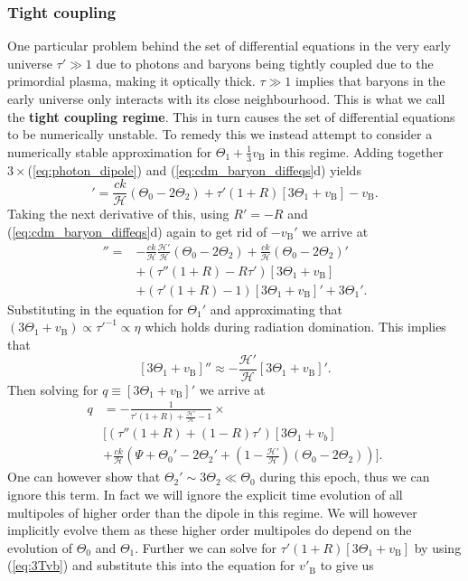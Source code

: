 \documentclass[%
reprint,
 amsmath,amssymb,
 aps,
]{revtex4-2}
\newcommand{\Hp}{\mathcal{H}}
\begin{document}
\subsubsection{Tight coupling}
One particular problem behind the set of differential equations in the very early universe $\tau'\gg1$ due to photons and baryons being tightly coupled due to the primordial plasma, making it optically thick. $\tau\gg1$ implies that baryons in the early universe only interacts with its close neighbourhood. This is what we call the \textbf{tight coupling regime}. This in turn causes the set of differential equations to be numerically unstable. To remedy this we instead attempt to consider a numerically stable approximation for $\Theta_1+\frac13v_\text{B}$ in this regime. Adding together $3\times$(\ref{eq:photon_dipole}) and (\ref{eq:cdm_baryon_diffeqs}d) yields
\begin{equation}
	[3\Theta_1+v_\text{B}]'=\frac{ck}{\Hp}(\Theta_0-2\Theta_2)+\tau'(1+R)[3\Theta_1+v_\text{B}]-v_\text{B}.
	\label{eq:3Tvb}
\end{equation}
Taking the next derivative of this, using $R'=-R$ and (\ref{eq:cdm_baryon_diffeqs}d) again to get rid of $-v_\text{B}'$ we arrive at
\begin{align*}
	[3\Theta_1+v_\text{B}]''=&-\frac{ck}{\Hp}\frac{\Hp'}{\Hp}(\Theta_0-2\Theta_2)+\frac{ck}{\Hp}(\Theta_0-2\Theta_2)'\\
	&+(\tau''(1+R)-R\tau')[3\Theta_1+v_\text{B}]\\
	&+(\tau'(1+R)-1)[3\Theta_1+v_\text{B}]'+3\Theta_1'.
\end{align*}
Substituting in the equation for $\Theta_1'$ and approximating that $(3\Theta_1+v_\text{B})\propto\tau'^{-1}\propto\eta$ which holds during radiation domination. This implies that
\[[3\Theta_1+v_\text{B}]''\approx-\frac{\Hp'}{\Hp}[3\Theta_1+v_\text{B}]'.\]
Then solving for $q\equiv[3\Theta_1+v_\text{B}]'$ we arrive at
\begin{align*}
	q&=-\frac{1}{\tau'(1+R)+\frac{\Hp'}{\Hp}-1}\times\\
	&\biggl[(\tau''(1+R)+(1-R)\tau')[3\Theta_1+v_b]\\
	&+\frac{ck}{\Hp}\left(\Psi+\Theta_0'-2\Theta_2'+\left(1-\frac{\Hp'}{\Hp}\right)(\Theta_0-2\Theta_2)\right)\biggr].
\end{align*}
One can however show that $\Theta_2'\sim3\Theta_2\ll\Theta_0$ during this epoch, thus we can ignore this term. In fact we will ignore the explicit time evolution of all multipoles of higher order than the dipole in this regime. We will however implicitly evolve them as these higher order multipoles do depend on the evolution of $\Theta_0$ and $\Theta_1$. Further we can solve for $\tau'(1+R)[3\Theta_1+v_\text{B}]$ by using (\ref{eq:3Tvb}) and substitute this into the equation for $v'_\text{B}$ to give us
\end{document}
